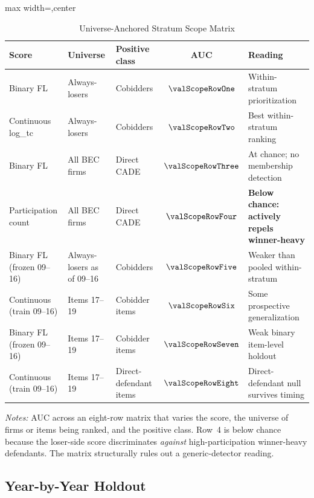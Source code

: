 \begin{table}[htbp]
\centering
\caption{Universe-Anchored Stratum Scope Matrix}
\label{tab:scope_matrix_submission}
\footnotesize
\begin{adjustbox}{max width=\textwidth,center}
\begin{threeparttable}
\begin{tabular}{p{3.3cm}p{3.0cm}p{3.0cm}cp{4.0cm}}
\toprule
Score & Universe & Positive class & AUC & Reading \\
\midrule
Binary FL & Always-losers & Cobidders & $\valScopeRowOne$
  & Within-stratum prioritization \\
Continuous log\_tc & Always-losers & Cobidders & $\valScopeRowTwo$
  & Best within-stratum ranking \\
Binary FL & All BEC firms & Direct CADE & $\valScopeRowThree$
  & At chance; no membership detection \\
Participation count & All BEC firms & Direct CADE & $\valScopeRowFour$
  & \textbf{Below chance: actively repels winner-heavy} \\
Binary FL (frozen 09--16) & Always-losers as of 09--16 & Cobidders
  & $\valScopeRowFive$ & Weaker than pooled within-stratum \\
Continuous (train 09--16) & Items 17--19 & Cobidder items
  & $\valScopeRowSix$ & Some prospective generalization \\
Binary FL (frozen 09--16) & Items 17--19 & Cobidder items
  & $\valScopeRowSeven$ & Weak binary item-level holdout \\
Continuous (train 09--16) & Items 17--19 & Direct-defendant items
  & $\valScopeRowEight$ & Direct-defendant null survives timing \\
\bottomrule
\end{tabular}
\begin{tablenotes}
\footnotesize
\item \textit{Notes:} AUC across an eight-row matrix that varies the
score, the universe of firms or items being ranked, and the positive
class. Row~4 is below chance because the loser-side score
discriminates \emph{against} high-participation winner-heavy
defendants. The matrix structurally rules out a generic-detector
reading.
\end{tablenotes}
\end{threeparttable}
\end{adjustbox}
\end{table}

\subsection{Year-by-Year Holdout}
\label{app:year_holdout_submission}


